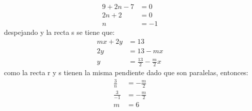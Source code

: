 \documentclass[12pt,letterpaper]{report}
\begin{document}
\begin{enumerate}
\begin{align*}
    9+2n-7&=0\\
    2n+2&=0\\
    n&=-1
\end{align*}
despejando y la recta s se tiene que:
\begin{align*}
    mx+2y&=13\\
    2y&=13-mx\\
    y&=\frac{13}{2}-\frac{m}{2}x
\end{align*}
como la recta r y s tienen la misma pendiente dado que son paralelas, entonces:
\begin{align*}
    \frac{3}{n}&=-\frac{m}{2}\\
    \frac{3}{-1}&=-\frac{m}{2}\\
    m&=6
\end{align*}
\end{enumerate}
\end{document}
